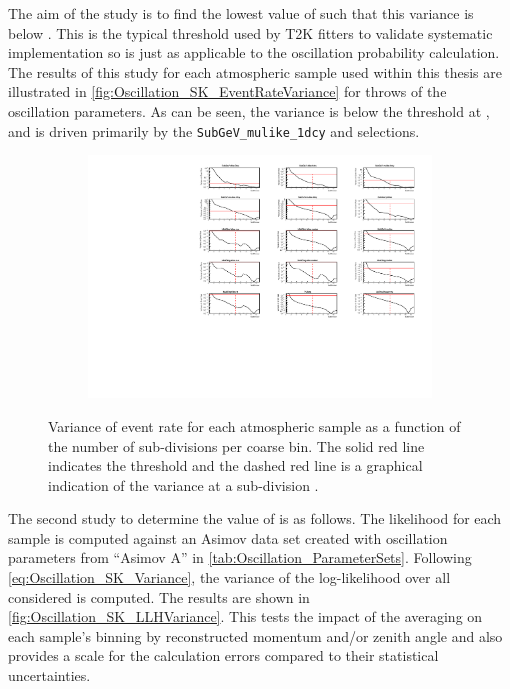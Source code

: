 The aim of the study is to find the lowest value of  such that this variance is below . This is the typical threshold used by T2K fitters to validate systematic implementation so is just as applicable to the oscillation probability calculation. The results of this study for each atmospheric sample used within this thesis are illustrated in \autoref{fig:Oscillation_SK_EventRateVariance} for  throws of the oscillation parameters. As can be seen, the variance is below the threshold at , and is driven primarily by the \texttt{SubGeV\_mulike\_1dcy} and  selections.

\begin{figure}[h]
  \begin{subfigure}[t]{\textwidth}
    \includegraphics[width=\textwidth, trim={0mm 0mm 0mm 0mm}, clip,page=1]{Figures/Oscillation/EventRate_VarianceGraphs.pdf}
  \end{subfigure}
  \caption{Variance of event rate for each atmospheric sample as a function of the number of sub-divisions per coarse bin. The solid red line indicates the  threshold and the dashed red line is a graphical indication of the variance at a sub-division .}
  \label{fig:Oscillation_SK_EventRateVariance}
\end{figure}

The second study to determine the value of  is as follows. The likelihood for each sample is computed against an Asimov data set created with oscillation parameters from ``Asimov A'' in \autoref{tab:Oscillation_ParameterSets}. Following \autoref{eq:Oscillation_SK_Variance}, the variance of the log-likelihood over all considered  is computed. The results are shown in \autoref{fig:Oscillation_SK_LLHVariance}. This tests the impact of the averaging on each sample's binning by reconstructed momentum and/or zenith angle and also provides a scale for the calculation errors compared to their statistical uncertainties. 

